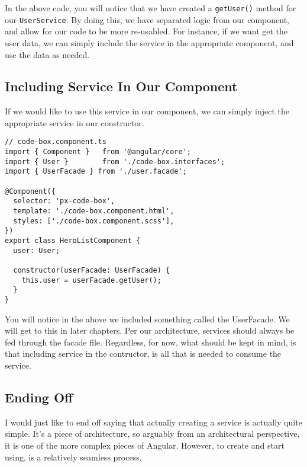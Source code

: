 In the above code, you will notice that we have created a \lstinline{getUser()}
method for our \lstinline{UserService}. By doing this, we have separated logic 
from our component, and allow for our code to be more re-usabled. For instance, 
if we want get the user data, we can simply include the service in the 
appropriate component, and use the data as needed. 

\subsection{Including Service In Our Component}
If we would like to use this service in our component, we can simply inject 
the appropriate service in our constructor. 

\begin{lstlisting}
// code-box.component.ts
import { Component }   from '@angular/core';
import { User }        from './code-box.interfaces';
import { UserFacade } from './user.facade';

@Component({
  selector: 'px-code-box',
  template: './code-box.component.html',
  styles: ['./code-box.component.scss'],
})
export class HeroListComponent {
  user: User;

  constructor(userFacade: UserFacade) {
    this.user = userFacade.getUser();
  }
}
\end{lstlisting}

You will notice in the above we included something called the UserFacade. We will 
get to this in later chapters. Per our architecture, services should always be 
fed through the facade file. Regardless, for now, what should be kept in mind, 
is that including service in the contructor, is all that is needed to consume 
the service. 

\subsection{Ending Off}
I would just like to end off saying that actually creating a service is 
actually quite simple. It's a piece of architecture, so arguably from an 
architectural perspective, it is one of the more complex pieces of Angular. 
However, to create and start using, is a relatively seamless process.
